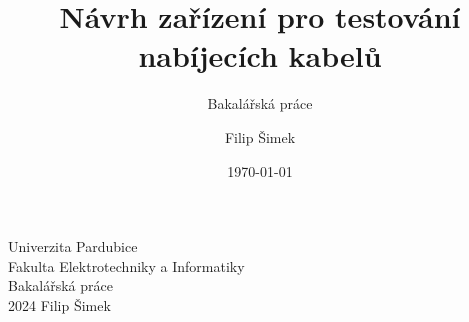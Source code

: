 \documentclass[22pt,a4paper,titlepage]{scrreprt}
\title{Návrh zařízení pro testování nabíjecích kabelů}
\subtitle{Bakalářská práce}
\author{Filip Šimek}
\date{\today}
\begin{document}
	\begin{titlepage}
		\begin{center}
			{Univerzita Pardubice} \\
			{Fakulta Elektrotechniky a Informatiky} \\
			\vfill
			{Bakalářská práce} \\
			\vfill
			{2024} \hfill {Filip Šimek} \\
			\end{center}
\end{titlepage}
\end{document}
